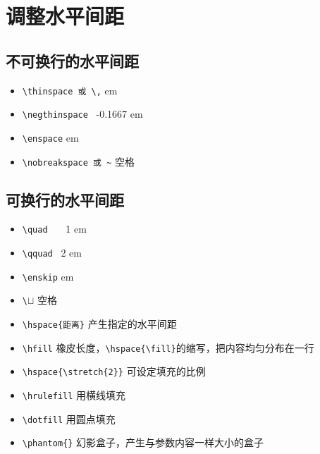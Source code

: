 \section{调整水平间距}
\subsection{不可换行的水平间距}

\begin{itemize}
  \item \verb|\thinspace 或 \,|  em
  \item \verb|\negthinspace| \qquad \quad \ -0.1667 em
  \item \verb|\enspace| \qquad \qquad {} em
  \item \verb|\nobreakspace 或 ~| \quad 空格
\end{itemize}

\subsection{可换行的水平间距}

\begin{itemize}
  \item \verb|\quad| \qquad \ \ \ 1 em
  \item \verb|\qquad| \qquad \ 2 em
  \item \verb|\enskip|  em
  \item \verb|\|$\sqcup$  \qquad \qquad 空格
  \item \verb|\hspace{距离}| \qquad 产生指定的水平间距
  \item \verb|\hfill| \qquad 橡皮长度，\verb|\hspace{\fill}|的缩写，把内容均匀分布在一行
  \item \verb|\hspace{\stretch{2}}| \qquad 可设定填充的比例
  \item \verb|\hrulefill| \qquad 用横线填充
  \item \verb|\dotfill| \qquad 用圆点填充
  \item \verb|\phantom{}| \qquad 幻影盒子，产生与参数内容一样大小的盒子
\end{itemize}